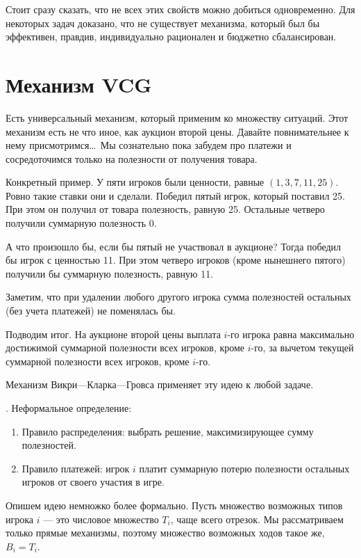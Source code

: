 Стоит сразу сказать, что не всех этих свойств можно добиться одновременно. Для некоторых задач доказано, что не существует механизма, который был бы эффективен, правдив, индивидуально рационален и бюджетно сбалансирован.


\section{Механизм VCG}

Есть универсальный механизм, который применим ко множеству ситуаций. Этот механизм есть не что иное, как аукцион второй цены. Давайте повнимательнее к нему присмотримся\ldots~Мы сознательно пока забудем про платежи и сосредоточимся только на полезности от получения товара.



Конкретный пример. У пяти игроков были ценности, равные $ (1,3,7,11,25) $. Ровно такие ставки они и сделали. Победил пятый игрок, который поставил 25.  При этом он получил от товара полезность, равную 25. Остальные четверо получили суммарную полезность 0.

А что произошло бы, если бы пятый не участвовал в аукционе? Тогда победил бы игрок с ценностью 11. При этом четверо игроков (кроме нынешнего пятого) получили бы суммарную полезность, равную 11.

Заметим, что при удалении любого другого игрока сумма полезностей остальных (без учета платежей) не поменялась бы.

Подводим итог. На аукционе второй цены выплата $i$-го игрока равна максимально достижимой суммарной полезности всех игроков, кроме $i$-го, за вычетом текущей суммарной полезности всех игроков, кроме $i$-го.

Механизм Викри—Кларка—Гровса применяет эту идею к любой задаче.

\begin{mydef} . Неформальное определение:
\begin{enumerate}
\item Правило распределения: выбрать решение, максимизирующее сумму полезностей.
\item Правило платежей: игрок $ i $ платит суммарную потерю полезности остальных игроков от своего участия в игре.
\end{enumerate}
\end{mydef}

Опишем идею немножко более формально. Пусть множество возможных типов игрока $ i $ — это числовое множество $ T_{i} $, чаще всего отрезок. Мы рассматриваем только прямые механизмы, поэтому множество возможных ходов такое же, $ B_{i}=T_{i}$.

